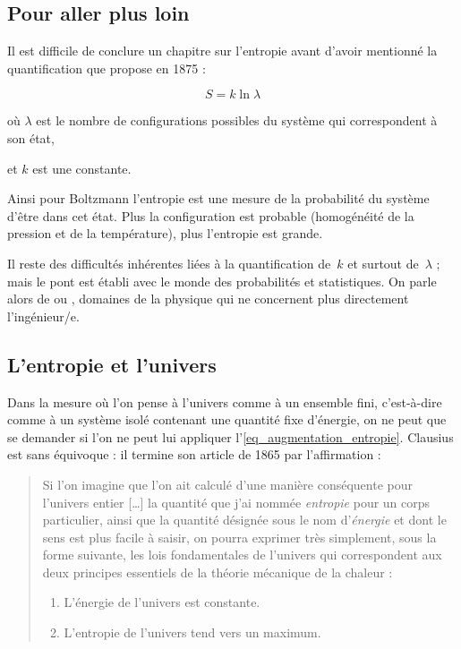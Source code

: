 	\subsection{Pour aller plus loin}
	
		Il est difficile de conclure un chapitre sur l’entropie avant d’avoir mentionné la quantification que propose  en 1875 :
			
			\begin{equation}
				S = k \ln \lambda
			\end{equation}
			
			\begin{equationterms}
				\item où \tab $\lambda$ \tab est le nombre de configurations possibles du système qui correspondent à son état, 
				\item et \tab $k$ \tab est une constante.
			\end{equationterms}
		
		Ainsi pour Boltzmann l’entropie est une mesure de la probabilité du système d’être dans cet état. Plus la configuration est probable (homogénéité de la pression et de la température), plus l’entropie est grande.
		
		Il reste des difficultés inhérentes liées à la quantification de~$k$ et surtout de~$\lambda$ ; mais le pont est établi avec le monde des probabilités et statistiques. On parle alors de  ou , domaines de la physique qui ne concernent plus directement l’ingénieur/e.
		
	\subsection{L’entropie et l’univers}
	
		Dans la mesure où l’on pense à l’univers comme à un ensemble fini, c’est-à-dire comme à un système isolé contenant une quantité fixe d’énergie, on ne peut que se demander si l’on ne peut lui appliquer l’\cref{eq_augmentation_entropie}. Clausius est sans équivoque : il termine son article de 1865 par l’affirmation :
			
			\begin{quote}
				Si l’on imagine que l’on ait calculé d’une manière conséquente pour l’univers entier […] la quantité que j’ai nommée \textit{entropie} pour un corps particulier, ainsi que la quantité désignée sous le nom d’\textit{énergie} et dont le sens est plus facile à saisir, on pourra exprimer très simplement, sous la forme suivante, les lois fondamentales de l’univers qui correspondent aux deux principes essentiels de la théorie mécanique de la chaleur :
					\begin{enumerate}
						\item L’énergie de l’univers est constante.
						\item L’entropie de l’univers tend vers un maximum.
					\end{enumerate}
			\end{quote}
		

